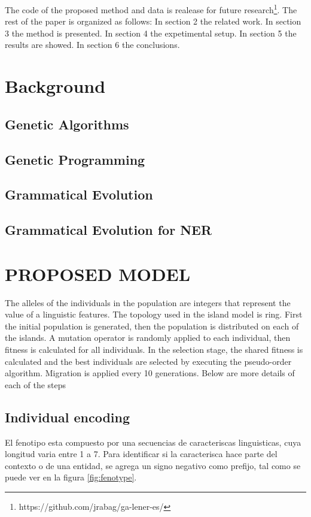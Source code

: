 The code of the proposed method and data is realease for future research\footnote{https://github.com/jrabag/ga\--lener\--es/}. The rest of the paper is organized as follows:
In section 2 the related work. In section 3 the method is presented.
In section 4 the expetimental setup. In section 5 the results are showed. In section 6 the conclusions.


\section{Background}
\subsection{Genetic Algorithms}
\subsection{Genetic Programming}
\subsection{Grammatical Evolution}
\subsection{Grammatical Evolution for NER}
\section{PROPOSED MODEL}

The alleles of the individuals in the population are integers that represent the value of a linguistic features. The topology used in the island model is ring. First the initial population is generated, then the population is distributed on each of the islands. A mutation operator is randomly applied to each individual, then fitness is calculated for all individuals. In the selection stage, the shared fitness is calculated and the best individuals are selected by executing the pseudo-order algorithm.
Migration is applied every 10 generations. Below are more details of each of the steps

\subsection{Individual encoding}

El fenotipo esta compuesto por una secuencias de caracteriscas linguisticas, cuya longitud varia entre 1 a 7. Para identificar si la caracterisca hace parte del contexto o de una entidad, se agrega un signo negativo como prefijo, tal como se puede ver en la figura \ref{fig:fenotype}.

